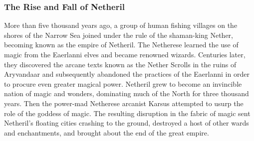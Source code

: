 \documentclass[10pt,a4paper,twoside,twocolumn,openany,bg=print,nodeprecatedcode]{dndbook}
\begin{document}
\subsubsection{The Rise and Fall of Netheril}
More than five thousand years ago, a group of human fishing villages on the shores of the Narrow Sea joined under the rule of the shaman-king Nether, becoming known as the empire of Netheril. The Netherese learned the use of magic from the Eaerlanni elves and became renowned wizards. Centuries later, they discovered the arcane texts known as the Nether Scrolls in the ruins of Aryvandaar and subsequently abandoned the practices of the Eaerlanni in order to procure even greater magical power.
Netheril grew to become an invincible nation of magic and wonders, dominating much of the North for three thousand years. Then the power-mad Netherese arcanist Karsus attempted to usurp the role of the goddess of magic. The resulting disruption in the fabric of magic sent Netheril's floating cities crashing to the ground, destroyed a host of other wards and enchantments, and brought about the end of the great empire.
\end{document}
